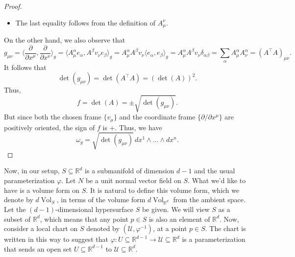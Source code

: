 \documentclass{article}
\theoremstyle{definition}
\renewcommand\det{\operatorname{det}}
\newcommand{\p}{\partial}
\newcommand{\R}{\mathbb{R}}
\newcommand{\al}{\alpha}
\newcommand{\be}{\beta}
\newcommand{\f}[2]{\frac{#1}{#2}}
\theoremstyle{theorem}
\newcommand{\Vol}{\operatorname{Vol}}
\begin{document}
\begin{proof}
\begin{itemize}
    \item The last equality follows from the definition of $A^\nu_\mu$. 
\end{itemize}
On the other hand, we also observe that
\begin{equation*}
    g_{\mu\nu} = \bigg\langle \f{\p}{\p x^\mu}, \f{\p}{\p x^\nu} \bigg\rangle_g = \langle A^\al_\mu e_\al, A^\be v_\nu e_\be  \rangle_g = A^\al_\mu A^\be v_\nu \langle e_\al, e_\be \rangle_g = A^\al_\mu A^\be v_\nu \delta_{\al\be} = \sum_\al A^\al_\mu A^\al_\nu = (A^\top A)_{\mu\nu}.
\end{equation*}
It follows that 
\begin{equation*}
    \det(g_{\mu\nu}) = \det(A^\top A) = (\det(A))^2.
\end{equation*}
Thus, 
\begin{equation*}
    f = \det(A) = \pm \sqrt{\det(g_{\mu\nu})}.
\end{equation*}
But since both the chosen frame $\{ v_\mu \}$ and the coordinate frame $\{ \p/\p x^\mu\}$ are positively oriented, the sign of $f$ is $+$. Thus, we have
\begin{equation*}
    \omega_g = \sqrt{\det(g_{\mu\nu})} \, dx^1 \land \dots \land dx^n. 
\end{equation*}
\end{proof}




Now, in our setup, $S\subseteq \R^d$ is a submanifold of dimension $d-1$ and the usual parameterization $\varphi$. Let $N$ be a unit normal vector field on $S$. What we'd like to have is a volume form on $S$. It is natural to define this volume form, which we denote by $d\Vol_S$, in terms of the volume form $d\Vol_{\R^d}$ from the ambient space. \\


Let the $(d-1)$-dimensional hypersurface $S$ be given. We will view $S$ as a subset of $\R^d$, which means that any point $p\in S$ is also an element of $\R^d$. Now, consider a local chart on $S$ denoted by $(\mathcal{U}, \varphi^{-1})$, at a point $p\in S$. The chart is written in this way to suggest that $\varphi: U \subseteq \R^{d-1} \to \mathcal{U} \subseteq \R^d$ is a parameterization that sends an open set $U\subseteq \R^{d-1}$ to $\mathcal{U}\subseteq \R^d$. \\
\end{document}

